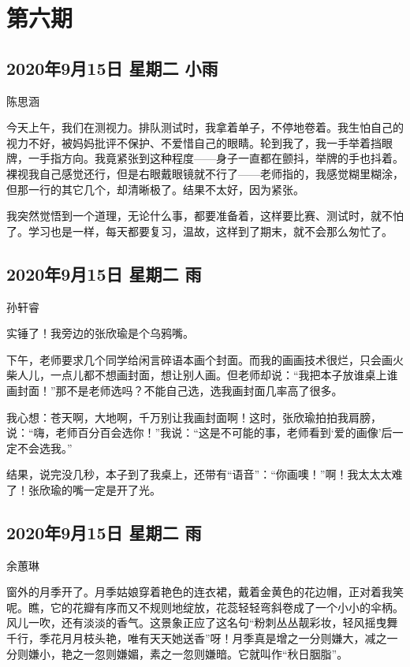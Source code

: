 \chapter{第六期}

\section{2020年9月15日 星期二 小雨}

陈思涵

今天上午，我们在测视力。排队测试时，我拿着单子，不停地卷着。我生怕自己的视力不好，被妈妈批评不保护、不爱惜自己的眼睛。轮到我了，我一手举着挡眼牌，一手指方向。我竟紧张到这种程度——身子一直都在颤抖，举牌的手也抖着。裸视我自己感觉还行，但是右眼戴眼镜就不行了——老师指的，我感觉糊里糊涂，但那一行的其它几个，却清晰极了。结果不太好，因为紧张。

我突然觉悟到一个道理，无论什么事，都要准备着，这样要比赛、测试时，就不怕了。学习也是一样，每天都要复习，温故，这样到了期末，就不会那么匆忙了。

\section{2020年9月15日 星期二 雨}

孙轩睿

实锤了！我旁边的张欣瑜是个乌鸦嘴。

下午，老师要求几个同学给闲言碎语本画个封面。而我的画画技术很烂，只会画火柴人儿，一点儿都不想画封面，想让别人画。但老师却说：“我把本子放谁桌上谁画封面！”那不是老师选吗？不能自己选，选我画封面几率高了很多。

我心想：苍天啊，大地啊，千万别让我画封面啊！这时，张欣瑜拍拍我肩膀，说：“嗨，老师百分百会选你！”我说：“这是不可能的事，老师看到`爱的画像'后一定不会选我。”

结果，说完没几秒，本子到了我桌上，还带有“语音”：“你画噢！”啊！我太太太难了！张欣瑜的嘴一定是开了光。

\section{2020年9月15日 星期二 雨}

余蕙琳

窗外的月季开了。月季姑娘穿着艳色的连衣裙，戴着金黄色的花边帽，正对着我笑呢。瞧，它的花瓣有序而又不规则地绽放，花蕊轻轻弯斜卷成了一个小小的伞柄。风儿一吹，还有淡淡的香气。这景象正应了这名句“粉刺丛丛靓彩妆，轻风摇曳舞千行，季花月月枝头艳，唯有天天她送香”呀！月季真是增之一分则嫌大，减之一分则嫌小，艳之一忽则嫌媚，素之一忽则嫌暗。它就叫作“秋日胭脂”。

